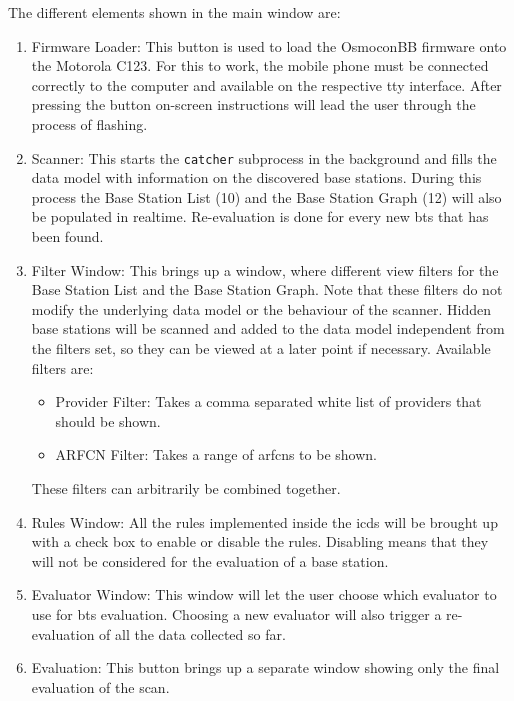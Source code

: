 The different elements shown in the main window are:
\begin{enumerate}
\item Firmware Loader: This button is used to load the OsmoconBB firmware onto the Motorola C123. 
For this to work, the mobile phone must be connected correctly to the computer and available on the respective tty interface.
After pressing the button on-screen instructions will lead the user through the process of flashing.

\item Scanner: This starts the \texttt{catcher} subprocess in the background and fills the data model with information on the discovered base stations.
During this process the Base Station List (10) and the Base Station Graph (12) will also be populated in realtime.
Re-evaluation is done for every new \gls{bts} that has been found.

\item Filter Window: This brings up a window, where different view filters for the Base Station List and the Base Station Graph.
Note that these filters do not modify the underlying data model or the behaviour of the scanner.
Hidden base stations will be scanned and added to the data model independent from the filters set, so they can be viewed at a later point if necessary.
Available filters are:
	\begin{itemize}
	\item Provider Filter: Takes a comma separated white list of providers that should be shown.
	\item ARFCN Filter: Takes a range of \glspl{arfcn} to be shown.
	\end{itemize}
These filters can arbitrarily be combined together.

\item Rules Window: All the rules implemented inside the \gls{icds} will be brought up with a check box to enable or disable the rules.
Disabling means that they will not be considered for the evaluation of a base station.

\item Evaluator Window: This window will let the user choose  which evaluator to use for \gls{bts} evaluation.
Choosing a new evaluator will also trigger a re-evaluation of all the data collected so far.

\item Evaluation: This button brings up a separate window showing only the final evaluation of the scan.


\end{enumerate}
